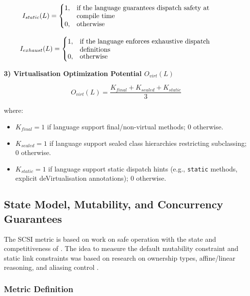 \[I_{static}(L) =
    \begin{cases}
        1, & \text{\parbox[t]{0.65\linewidth}{\raggedright
            if the language guarantees dispatch safety at compile time%
         }} \\
        0, & \text{\parbox[t]{0.65\linewidth}{\raggedright
            otherwise%
         }}
    \end{cases}
\]

\[I_{exhaust}(L) =
    \begin{cases}
    1, & \text{\parbox[t]{0.65\linewidth}{\raggedright
            if the language enforces exhaustive dispatch definitions%
         }} \\
    0, & \text{\parbox[t]{0.65\linewidth}{\raggedright
            otherwise%
         }}
    \end{cases}
\]

\textbf{3) Virtualisation Optimization Potential $O_{virt}(L)$}

\[
O_{virt}(L) = \frac{K_{final} + K_{sealed} + K_{static}}{3}
\]

where:
\begin{itemize}
    \item $K_{final} = 1$ if language support final/non-virtual methods; $0$ otherwise.
    \item $K_{sealed} = 1$ if language support sealed class hierarchies restricting subclassing; $0$ otherwise.
    \item $K_{static} = 1$ if language support static dispatch hints (e.g., \texttt{static} methods, explicit deVirtualisation annotations); $0$ otherwise.
\end{itemize}

\subsection{State Model, Mutability, and Concurrency Guarantees}

The SCSI metric is based on work on safe operation with the state and competitiveness of \cite{clarke1998ownership}. The idea to measure the default mutability constraint and static link constraints was based on research on ownership types, affine/linear reasoning, and aliasing control \cite{clarke1998ownership}.

\subsubsection{Metric Definition}

